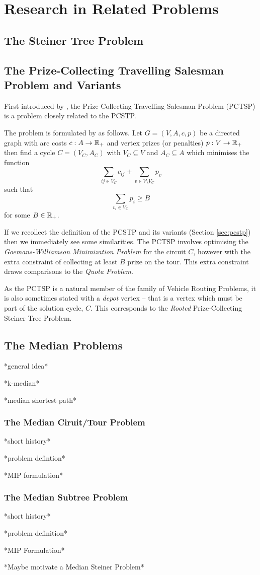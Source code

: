 \chapter{Research in Related Problems}
\label{chap:related}


\section{The Steiner Tree Problem}
\section{The Prize-Collecting Travelling Salesman Problem and Variants}
First introduced by \citet*{balas1989prize}, the Prize-Collecting Travelling Salesman Problem
(PCTSP) is a problem closely related to the
PCSTP.

The problem is formulated by \citeauthor{balas1989prize} as follows. Let
$G = (V, A, c, p)$ be a directed
graph with arc costs $c: A \to \mathbb{R}_+$ and vertex prizes (or penalties) $p: V \to \mathbb{R}_+$
then find a cycle $C = (V_C, A_C)$ with $V_C \subseteq V$ and $A_C \subseteq A$ which
minimises the function
$$\sum_{ij \in V_C} c_{ij} + \sum_{v \in V \setminus V_C} p_v$$
such that
$$\sum_{v_i \in V_C} p_i \geq B$$
for some $B \in \mathbb{R}_+$.

If we recollect the definition of the PCSTP and its variants (Section \ref{sec:pcstp}) then
we immediately see some similarities. The PCTSP involves optimising the
\textit{Goemans-Williamson Minimization Problem} for the circuit $C$, however with the extra
constraint of collecting at least $B$ prize on the tour. This extra constraint draws comparisons
to the \textit{Quota Problem}.

As the PCTSP is a natural member of the family of Vehicle Routing Problems, it is also sometimes
stated with a \textit{depot} vertex \citep{feillet2005traveling} -- that is a vertex which
must be part of the solution cycle, $C$. This corresponds to the \textit{Rooted}
 Prize-Collecting Steiner Tree Problem.
 \section{The Median  Problems}
 *general idea*
 
 *k-median*
 
 *median shortest path*
\subsection{The Median Ciruit/Tour Problem}
*short history*

*problem defintion*

*MIP formulation*
\subsection{The Median Subtree Problem}
*short history*

*problem definition*

*MIP Formulation*

*Maybe motivate a Median Steiner Problem*


